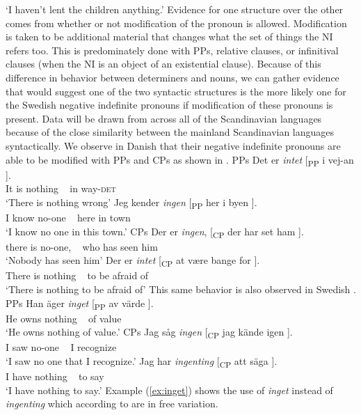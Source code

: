\documentclass[12pt, letterpaper]{article}
\begin{document}
		\glt `I haven't lent the children anything.'
		\z 
	\z
\ex Evidence for one structure over the other comes from whether or not modification of the pronoun is allowed. 
	\ea Modification is taken to be additional material that changes what the set of things the NI refers too. 
	\ex This is predominately done with PPs, relative clauses, or infinitival clauses (when the NI is an object of an existential clause).
	\z 
\ex Because of this difference in behavior between determiners and nouns, we can gather evidence that would suggest one of the two syntactic structures is the more likely one for the Swedish negative indefinite pronouns if modification of these pronouns is present.
\ex Data will be drawn from across all of the Scandinavian languages because of the close similarity between the mainland Scandinavian languages syntactically.
\ex We observe in Danish that their negative indefinite pronouns are able to be modified with PPs and CPs as shown in \citet[218ff]{allanDanishComprehensiveGrammar1995}.
	\ea PPs
		\ea 
		\gll Det er \textit{intet} [\textsubscript{PP} i vej-an ].\\
			It is nothing ~ in way-\textsc{det}\\
		\glt `There is nothing wrong'
		\ex 
		\gll Jeg kender \textit{ingen} [\textsubscript{PP} her i byen ].\\
			I know no-one ~ here in town\\
		\glt `I know no one in this town.'
		\z
	\ex CPs
		\ea 
		\gll Der er \textit{ingen}, [\textsubscript{CP} der har set ham ].\\
		there is no-one, ~ who has seen him\\
		\glt `Nobody has seen him'
		\ex
		\gll Der er \textit{intet} [\textsubscript{CP} at være bange for ].\\
		There is nothing ~ to be afraid of\\
		\glt `There is nothing to be afraid of'
		\z 
	\z
\ex This same behavior is also observed in Swedish \citep[197ff]{holmesSwedishComprehensiveGrammar2013}.
	\ea PPs
		\ea \label{ex:inget}
		\gll Han äger \textit{inget} [\textsubscript{PP} av värde ].\\
			He owns nothing ~ of value\\
		\glt `He owns nothing of value.'
		\z 
	\ex CPs
		\ea
		\gll Jag såg \textit{ingen} [\textsubscript{CP} jag {kände igen} ].\\
		I saw no-one ~ I recognize\\
		\glt `I saw no one that I recognize.'
		\ex 
		\gll Jag har \textit{ingenting} [\textsubscript{CP} att säga ].\\
		I have nothing ~ to say\\
		\glt `I have nothing to say.'
		\z 
	\z
\ex Example (\ref{ex:inget}) shows the use of \textit{inget} instead of \textit{ingenting} which according to \citet{holmesSwedishComprehensiveGrammar2013} are in free variation.
\end{document}
